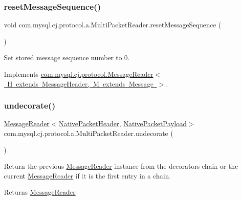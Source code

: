 \subsubsection{\texorpdfstring{reset\+Message\+Sequence()}{resetMessageSequence()}}
{\footnotesize\ttfamily void com.\+mysql.\+cj.\+protocol.\+a.\+Multi\+Packet\+Reader.\+reset\+Message\+Sequence (\begin{DoxyParamCaption}{ }\end{DoxyParamCaption})}

Set stored message sequence number to 0. 

Implements \mbox{\hyperlink{interfacecom_1_1mysql_1_1cj_1_1protocol_1_1_message_reader_a3161e55ab8c1bb4d533aa6d2700fb14d}{com.\+mysql.\+cj.\+protocol.\+Message\+Reader$<$ H extends Message\+Header, M extends Message $>$}}.

\mbox{\label{classcom_1_1mysql_1_1cj_1_1protocol_1_1a_1_1_multi_packet_reader_a88dba17bd898d3e8516fdb4a096297c5}} 
\subsubsection{\texorpdfstring{undecorate()}{undecorate()}}
{\footnotesize\ttfamily \mbox{\hyperlink{interfacecom_1_1mysql_1_1cj_1_1protocol_1_1_message_reader}{Message\+Reader}}$<$\mbox{\hyperlink{classcom_1_1mysql_1_1cj_1_1protocol_1_1a_1_1_native_packet_header}{Native\+Packet\+Header}}, \mbox{\hyperlink{classcom_1_1mysql_1_1cj_1_1protocol_1_1a_1_1_native_packet_payload}{Native\+Packet\+Payload}}$>$ com.\+mysql.\+cj.\+protocol.\+a.\+Multi\+Packet\+Reader.\+undecorate (\begin{DoxyParamCaption}{ }\end{DoxyParamCaption})}

Return the previous \mbox{\hyperlink{interfacecom_1_1mysql_1_1cj_1_1protocol_1_1_message_reader}{Message\+Reader}} instance from the decorators chain or the current \mbox{\hyperlink{interfacecom_1_1mysql_1_1cj_1_1protocol_1_1_message_reader}{Message\+Reader}} if it is the first entry in a chain.

\begin{DoxyReturn}{Returns}
\mbox{\hyperlink{interfacecom_1_1mysql_1_1cj_1_1protocol_1_1_message_reader}{Message\+Reader}} 
\end{DoxyReturn}


